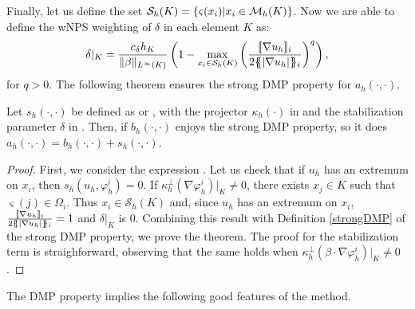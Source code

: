 Finally, let us define the set $\mathcal{S}_h(K) = \{\varsigma(x_i) | x_i \in \mathcal{M}_h(K)\}$. Now we are able to define the  wNPS  weighting of $\delta$ in each element $K$ as:
\begin{align}\label{eq-tildeltaSZ}
\delta|_K = \frac{c_\delta h_K}{\|\beta\|_{L^\infty(K)}} \left(1-\max_{x_i \in \mathcal{S}_h(K)}\left(\frac{ \lbrack\!\lbrack \nabla u_h \rbrack\!\rbrack_i }{2\{\! \!\{ |\nabla u_h|\}\! \!\}_i}\right)^q\right),
\end{align}
for $q>0$. The following theorem ensures the strong DMP property for $a_h(\cdot,\cdot)$.
\begin{theorem}
Let $s_h(\cdot,\cdot)$ be  defined as  or , with the projector $\kappa_h(\cdot)$ in  and the stabilization parameter $\delta$ in . Then, if $b_h(\cdot,\cdot)$ enjoys the strong DMP property, so it does $a_h(\cdot,\cdot) =b_h(\cdot,\cdot) + s_h(\cdot,\cdot)$.
\end{theorem}
\begin{proof}First, we consider the expression . Let us check that if $u_h$ has an extremum on $x_i$, then ${s}_h(u_h,\varphi_h^i) = 0.$ If $\kappa_h^\perp(\nabla \varphi^i_h)|_K\neq 0$, there exists $x_j\in K$ such that $\varsigma (j) \in \Omega_i$. Thus $x_i\in  \mathcal{S}_h(K)$ and, since $u_h$ has an extremum on $x_i$,  $  \frac{ \lbrack\!\lbrack \nabla u_h  \rbrack\!\rbrack_i }{  2\{\! \!\{ |\nabla u_h|\}\! \!\}_i}=1$ and  $\delta|_K$ is $ 0$. Combining this result with Definition \ref{strongDMP} of the strong DMP property, we prove the theorem. The proof for the stabilization term  is straighforward, observing that the same holds when $\kappa_h^\perp( \beta \cdot \nabla \varphi^i_h)|_K\neq 0$.
\end{proof}


The DMP property implies the following good features of the method.

